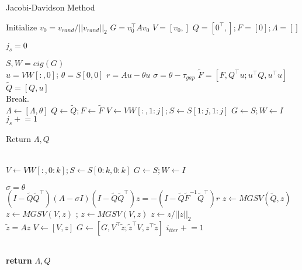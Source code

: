\documentclass[a4paper]{article}
\begin{document}
\begin{algorithm}
\caption{Jacobi-Davidson Method}\label{alg:JDM}
\begin{algorithmic}[1]

\State Initialize $v_0 = v_{rand} / ||v_{rand}||_2$ 
\State $G = v_0^\top A v_0$ 
\State $V = [v_0,]$ 
\State $Q = [0^\top,]; F = [0] ; \Lambda = [] $

\State $j_s = 0$ 
\\


    \State $ S,W = eig(G)$
        \\
        \State $u = VW[:,0]$; $\theta = S[0,0]$
        \State $r = Au - \theta u$
        \State $\sigma = \theta - \tau_{gap}$
        \State $\tilde{F} = [F, Q^\top u ; u^\top Q , u^\top u]$
        \State $\tilde{Q} = [Q,u]$
    \\
        \If{$(||r||_2 > \epsilon) \cup ( (dim(S)[0] <= 1) \cap (j_s \mathrel{!}= k - 1))$]} 
            \State Break.
        \EndIf
        \\
        \State $\Lambda \gets [\Lambda, \theta]$
        \State $Q \gets \tilde{Q}; F \gets \tilde{F}$
        \State $V \gets V W[:,1:j]; S \gets S[1:j,1:j]$
        \State $G \gets S ; W \gets I$
        \State $j_s \mathrel{+} = 1$

            \State Return $\Lambda, Q$ 
        \EndIf

    \EndWhile
    \\ 
        \State $V \gets VW[:, 0:k] ; S \gets S[0:k,0:k] $
        \State $G \gets S; W \gets I $
    \EndIf

        \State $\sigma = \theta$
    \EndIf
    \\
    \State $(I-\tilde{Q}\tilde{Q}^\top) (A - \sigma I ) (I - \tilde{Q}\tilde{Q}^\top) z = -(I - \tilde{Q} \tilde{F}^{-1} \tilde{Q}^\top)r$ 
    \State $z \gets MGSV(\tilde{Q}, z)$ 
    \State $z \gets MGSV(V, z)$ ; $z \gets MGSV(V, z)$
    \State $z \gets z / ||z||_2$
    \\
    \State $\tilde{z} = Az$
    \State $V \gets [V,z]$ 
    \State $G \gets [G, V^\top \tilde{z} ; \tilde{z}^\top V, z^\top \tilde{z}]$ 
    \State $i_{iter} \mathrel{+}= 1 $
\EndFor

\\
\State \textbf{return} $\Lambda, Q$ 
\EndProcedure
\end{algorithmic}
\end{algorithm}
\end{document}
